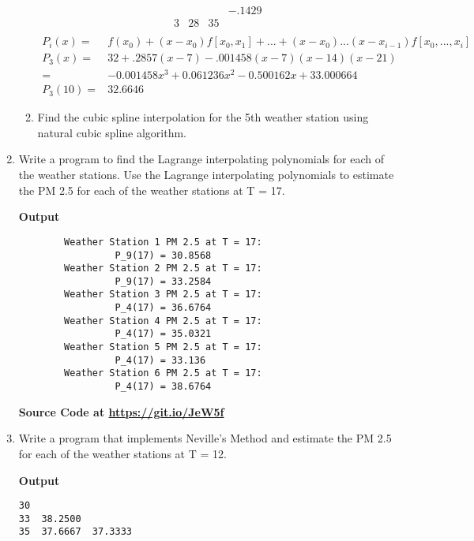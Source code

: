 \documentclass{exam}
\begin{document}
\begin{enumerate}
\begin{enumerate}
\begin{equation*}
\begin{array}{cccccc}
                  &     &       & -.1429\\
                3 & 28  & 35\\
            \end{array}
        \end{equation*}
        \begin{align*}
            P_i(x)=&f(x_0)+(x-x_0)f[x_0,x_1]+...+(x-x_0)...(x-x_{i-1})f[x_0,...,x_i]\\
            P_3(x)=&32 + .2857(x-7) - .001458(x-7)(x-14)(x-21)\\
            =&-0.001458x^3+0.061236x^2-0.500162x+33.000664\\
            P_3(10)=&\mathbf{32.6646}
        \end{align*}
        \newpage
        \item Find the cubic spline interpolation for the 5th weather station using natural cubic spline algorithm.
    \end{enumerate}
    \newpage
    \item  Write a program to find the Lagrange interpolating polynomials for each of the weather stations. Use the Lagrange interpolating polynomials to estimate the PM 2.5 for each of the weather stations at T = 17.
    \begin{center}
        \textbf{Output}
    \end{center}
    \begin{verbatim}
        Weather Station 1 PM 2.5 at T = 17:
                 P_9(17) = 30.8568
        Weather Station 2 PM 2.5 at T = 17:
                 P_9(17) = 33.2584
        Weather Station 3 PM 2.5 at T = 17:
                 P_4(17) = 36.6764
        Weather Station 4 PM 2.5 at T = 17:
                 P_4(17) = 35.0321
        Weather Station 5 PM 2.5 at T = 17:
                 P_4(17) = 33.136
        Weather Station 6 PM 2.5 at T = 17:
                 P_4(17) = 38.6764
    \end{verbatim}
    \begin{center}
        \textbf{Source Code at \url{https://git.io/JeW5f}}
    \end{center}
    \newpage
	\item  Write a program that implements Neville's Method and estimate the PM 2.5 for each of the weather stations at T = 12.
    \begin{center}
        \textbf{Output}
    \end{center}
    \begin{verbatim}
30
33  38.2500
35  37.6667  37.3333

\end{verbatim}
\end{enumerate}
\end{document}
